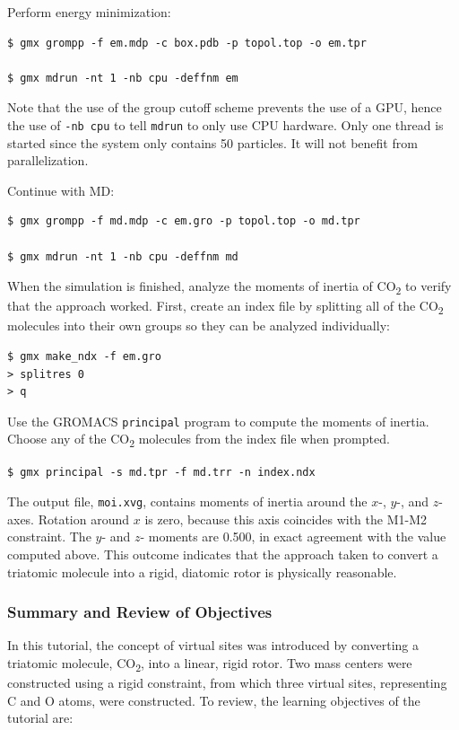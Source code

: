 \documentclass[9pt,tutorial,pubversion]{livecoms}
\begin{document}
Perform energy minimization:

\begin{lstlisting}
$ gmx grompp -f em.mdp -c box.pdb -p topol.top -o em.tpr

$ gmx mdrun -nt 1 -nb cpu -deffnm em
\end{lstlisting}
%
Note that the use of the group cutoff scheme prevents the use of a GPU, hence the use of \texttt{-nb cpu} to tell \texttt{mdrun} to only use CPU hardware. Only one thread is started since the system only contains 50 particles. It will not benefit from parallelization.

Continue with MD:

\begin{lstlisting}
$ gmx grompp -f md.mdp -c em.gro -p topol.top -o md.tpr

$ gmx mdrun -nt 1 -nb cpu -deffnm md
\end{lstlisting}

When the simulation is finished, analyze the moments of inertia of CO\textsubscript{2} to verify that the approach worked. First, create an index file by splitting all of the CO\textsubscript{2} molecules into their own groups so they can be analyzed individually:

\begin{lstlisting}
$ gmx make_ndx -f em.gro
> splitres 0
> q
\end{lstlisting}

Use the GROMACS \texttt{principal} program to compute the moments of inertia. Choose any of the CO\textsubscript{2} molecules from the index file when prompted.

\begin{lstlisting}
$ gmx principal -s md.tpr -f md.trr -n index.ndx
\end{lstlisting}
%
The output file, \texttt{moi.xvg}, contains moments of inertia around the $x$-, $y$-, and $z$-axes. Rotation around $x$ is zero, because this axis coincides with the M1-M2 constraint. The $y$- and $z$- moments are 0.500, in exact agreement with the value computed above. This outcome indicates that the approach taken to convert a triatomic molecule into a rigid, diatomic rotor is physically reasonable.

\subsubsection{Summary and Review of Objectives} \label{vsite_summary}

In this tutorial, the concept of virtual sites was introduced by converting a triatomic molecule, CO\textsubscript{2}, into a linear, rigid rotor. Two mass centers were constructed using a rigid constraint, from which three virtual sites, representing C and O atoms, were constructed. To review, the learning objectives of the tutorial are:
\end{document}

